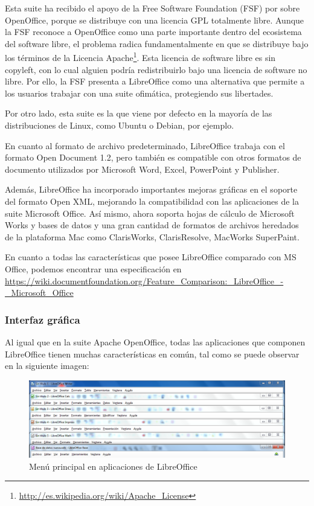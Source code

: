 \documentclass[12pt]{article}
\begin{document}
Esta suite ha recibido el apoyo de la Free Software Foundation (FSF) por sobre OpenOffice, porque se distribuye con una licencia GPL totalmente libre. Aunque la FSF reconoce a OpenOffice como una parte importante dentro del ecosistema del software libre, el problema radica fundamentalmente en que se distribuye bajo los términos de la Licencia Apache\footnote{\url{http://es.wikipedia.org/wiki/Apache\_License}}. Esta licencia de software libre es sin copyleft, con lo cual alguien podría redistribuirlo bajo una licencia de software no libre. Por ello, la FSF presenta a LibreOffice como una alternativa que permite a los usuarios trabajar con una suite ofimática, protegiendo sus libertades.   

Por otro lado, esta suite es la que viene por defecto en la mayoría de las distribuciones de Linux, como Ubuntu o Debian, por ejemplo.

En cuanto al formato de archivo predeterminado, LibreOffice trabaja con el formato Open Document 1.2, pero también es compatible con otros formatos de documento utilizados por Microsoft Word, Excel, PowerPoint y Publisher. 

Además, LibreOffice ha incorporado importantes mejoras gráficas en el soporte del formato Open XML, mejorando la compatibilidad con las aplicaciones de la suite Microsoft Office. Así mismo, ahora soporta hojas de cálculo de Microsoft Works y bases de datos y una gran cantidad de formatos de archivos heredados de la plataforma Mac como ClarisWorks, ClarisResolve, MacWorks SuperPaint. 

En cuanto a todas las características que posee LibreOffice comparado con MS Office, podemos encontrar una especificación en \url{https://wiki.documentfoundation.org/Feature_Comparison:_LibreOffice_-_Microsoft_Office}

\subsubsection{Interfaz gráfica}

Al igual que en la suite Apache OpenOffice, todas las aplicaciones que componen LibreOffice tienen muchas características en común, tal como se puede observar en la siguiente imagen:

\begin{figure}[H]
\centering
\includegraphics[width=1\textwidth]{menuAppsLO.png}
\renewcommand{\figurename}{Fig.}
\caption{Menú principal en aplicaciones de LibreOffice}
\label{contexto:figura}
\end{figure}
\end{document}
